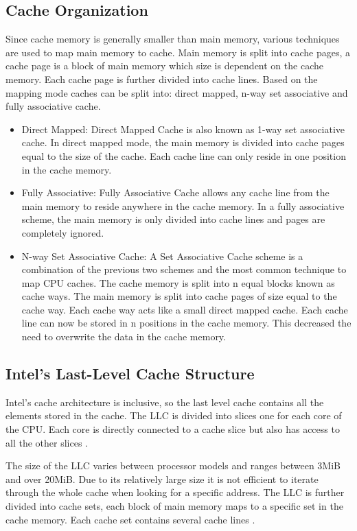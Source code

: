\documentclass[10pt,a4paper,twoside]{book}
\begin{document}
\subsection{Cache Organization}
Since cache memory is generally smaller than main memory, various techniques are used to map main memory to cache. Main memory is split into cache pages, a cache page is a block of main memory which size is dependent on the cache memory. Each cache page is further divided into cache lines. Based on the mapping mode caches can be split into: direct mapped, n-way set associative and fully associative cache.
\begin{itemize}
\item Direct Mapped: Direct Mapped Cache is also known as 1-way set associative cache. In direct mapped mode, the main memory is divided into cache pages equal to the size of the cache. Each cache line can only reside in one position in the cache memory. 
\item Fully Associative: Fully Associative Cache allows any cache line from the main memory to reside anywhere in the cache memory. In a fully associative scheme, the main memory is only divided into cache lines and pages are completely ignored.
\item N-way Set Associative Cache: A Set Associative Cache scheme is a combination of the previous two schemes and the most common technique to map CPU caches. The cache memory is split into n equal blocks known as cache ways. The main memory is split into cache pages of size equal to the cache way. Each cache way acts like a small direct mapped cache. Each cache line can now be stored in n positions in the cache memory. This decreased the need to overwrite the data in the cache memory.
\end{itemize}

\subsection{Intel's Last-Level Cache Structure}
Intel's cache architecture is inclusive, so the last level cache contains all the elements stored in the cache. The LLC is divided into slices one for each core of the CPU. Each core is directly connected to a cache slice but also has access to all the other slices \cite{oren2015spy}.

The size of the LLC varies between processor models and ranges between 3MiB and over 20MiB. Due to its relatively large size it is not efficient to iterate through the whole cache when looking for a specific address. The LLC is further divided into cache sets, each block of main memory maps to a specific set in the cache memory. Each cache set contains several cache lines \cite{oren2015spy}. 
\end{document}

